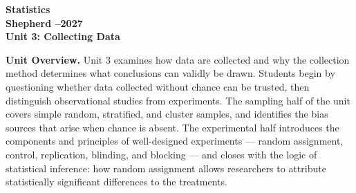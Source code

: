 \documentclass[10pt]{article}
\begin{document}
\vspace{-1.3in}

\begin{center}
  {\color{white}\bfseries\fontsize{28}{34}\selectfont Statistics}\\[8pt]
  {\color{goldacc}\bfseries\Large Shepherd --2027}\\[14pt]
  {\color{white}\bfseries\LARGE Unit 3: Collecting Data}\\[4pt]
\end{center}

\vspace{0.30in}

\begin{tcolorbox}[colback=sky,colframe=navy,boxrule=0.9pt,arc=2mm,
    left=4mm,right=4mm,top=3mm,bottom=3mm]
  \textbf{Unit Overview.}\quad
  Unit 3 examines how data are collected and why the collection method determines
  what conclusions can validly be drawn.  Students begin by questioning whether data
  collected without chance can be trusted, then distinguish observational studies from
  experiments.  The sampling half of the unit covers simple random, stratified, and cluster
  samples, and identifies the bias sources that arise when chance is
  absent.  The experimental half introduces the components and principles of
  well-designed experiments --- random assignment, control, replication, blinding, and
  blocking --- and closes with the logic of statistical inference: how random assignment
  allows researchers to attribute statistically significant differences to the treatments.
\end{tcolorbox}

\vspace{0.22in}
\end{document}
